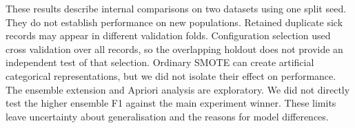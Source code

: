 These results describe internal comparisons on two datasets using one split seed. They do not establish performance on new populations. Retained duplicate sick records may appear in different validation folds. Configuration selection used cross validation over all records, so the overlapping holdout does not provide an independent test of that selection. Ordinary SMOTE can create artificial categorical representations, but we did not isolate their effect on performance. The ensemble extension and Apriori analysis are exploratory. We did not directly test the higher ensemble F1 against the main experiment winner. These limits leave uncertainty about generalisation and the reasons for model differences.
